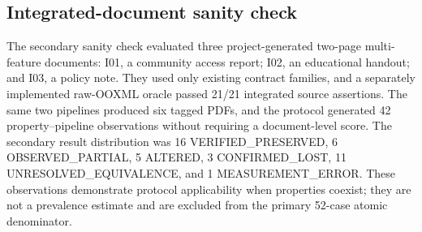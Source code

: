 \subsection{Integrated-document sanity check}

The secondary sanity check evaluated three project-generated two-page multi-feature documents: I01, a community access report; I02, an educational handout; and I03, a policy note. They used only existing contract families, and a separately implemented raw-OOXML oracle passed 21/21 integrated source assertions. The same two pipelines produced six tagged PDFs, and the protocol generated 42 property--pipeline observations without requiring a document-level score. The secondary result distribution was 16 VERIFIED\_PRESERVED, 6 OBSERVED\_PARTIAL, 5 ALTERED, 3 CONFIRMED\_LOST, 11 UNRESOLVED\_EQUIVALENCE, and 1 MEASUREMENT\_ERROR. These observations demonstrate protocol applicability when properties coexist; they are not a prevalence estimate and are excluded from the primary 52-case atomic denominator.


